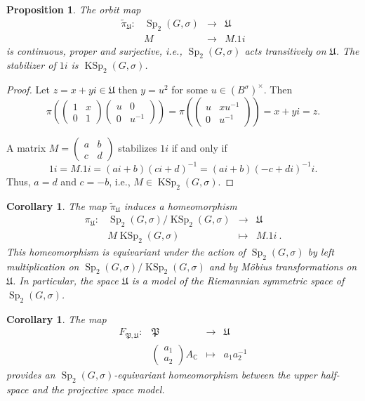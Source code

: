 \documentclass[a4paper,oneside,11pt]{amsart}
\DeclareMathOperator{\Sp}{Sp}
\DeclareMathOperator{\KSp}{KSp}
\theoremstyle{plain}
\newtheorem{cor}[teo]{Corollary}
\newtheorem{prop}[teo]{Proposition}
\theoremstyle{definition}
\theoremstyle{remark}
\begin{document}
\begin{prop}
The orbit map
$$\begin{matrix}
\tilde\pi_\mathfrak U\colon & \Sp_2(G,\sigma) & \to & \mathfrak U\\
 & M & \to & M.1i
\end{matrix}$$
is continuous, proper and surjective, i.e., $\Sp_2(G,\sigma)$ acts transitively on $\mathfrak U$. The stabilizer of $1i$ is $\KSp_2(G,\sigma)$.
\end{prop}

\begin{proof}
Let $z=x+yi\in\mathfrak U$ then $y=u^2$ for some $u\in (B^{\sigma})^\times$. Then
$$\pi\left(\!\!
\begin{pmatrix}
1 & x \\
0 & 1
\end{pmatrix}
\begin{pmatrix}
u & 0 \\
0 & u^{-1}
\end{pmatrix}\!\!\right)=
\pi\left(\!\!
\begin{pmatrix}
u & xu^{-1} \\
0 & u^{-1}
\end{pmatrix}\!\!\right)=x+yi=z.$$

\noindent A matrix $M=\begin{pmatrix}
a & b \\
c & d
\end{pmatrix}$
stabilizes $1i$ if and only if
$$1i=M.1i=(ai+b)(ci+d)^{-1}=(ai+b)(-c+di)^{-1}i.$$
Thus, $a=d$ and $c=-b$, i.e., $M\in\KSp_2(G,\sigma)$.
\end{proof}

\begin{cor}
The map $\tilde\pi_\mathfrak U$ induces a homeomorphism
$$\begin{matrix}
\pi_\mathfrak U \colon & \Sp_2(G,\sigma)/\KSp_2(G,\sigma) & \to & \mathfrak U \\
 & M\KSp_2(G,\sigma) & \mapsto & M.1i\ .
\end{matrix}$$
This homeomorphism is equivariant under the action of $\Sp_2(G,\sigma)$ by left multiplication on $\Sp_2(G,\sigma)/\KSp_2(G,\sigma)$ and by M\"obius transformations on $\mathfrak U$. In particular, the space $\mathfrak U$ is a model of the Riemannian symmetric space of $\Sp_2(G,\sigma)$.
\end{cor}

\begin{cor}
    The map
    $$\begin{array}{rccc}
    F_{\mathfrak P,\mathfrak U}\colon &\mathfrak P & \to & \mathfrak U\\
    &\begin{pmatrix}
        a_1 \\ a_2
    \end{pmatrix}A_\mathbb C & \mapsto & a_1a_2^{-1}
    \end{array}$$
    provides an $\Sp_2(G,\sigma)$-equivariant homeomorphism between the upper half-space and the projective space model.
\end{cor}
\end{document}
